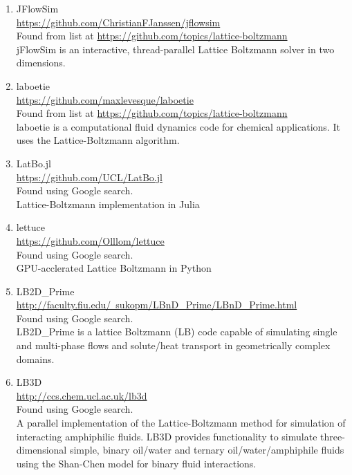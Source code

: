 \documentclass{article}
\begin{document}
\begin{enumerate}
	\item JFlowSim \\
	\href{https://github.com/ChristianFJanssen/jflowsim}{https://github.com/ChristianFJanssen/jflowsim} \\
		Found from list at \href{https://github.com/topics/lattice-boltzmann}{https://github.com/topics/lattice-boltzmann}\\
	jFlowSim is an interactive, thread-parallel Lattice Boltzmann solver in two dimensions.
	
	\item laboetie
\\
	\href{https://github.com/maxlevesque/laboetie}{https://github.com/maxlevesque/laboetie}
\\
		Found from list at \href{https://github.com/topics/lattice-boltzmann}{https://github.com/topics/lattice-boltzmann}\\
	laboetie is a computational fluid dynamics code for chemical applications.
	It uses the Lattice-Boltzmann algorithm.
	
	\item LatBo.jl \\
	\href{https://github.com/UCL/LatBo.jl}{https://github.com/UCL/LatBo.jl}
\\
	Found using Google search.\\
	Lattice-Boltzmann implementation in Julia
	
	\item lettuce
\\
	\href{https://github.com/Olllom/lettuce}{https://github.com/Olllom/lettuce}
\\
	Found using Google search.\\
	GPU-acclerated Lattice Boltzmann in Python
	
	\item LB2D\_Prime
\\
	\href{http://faculty.fiu.edu/~sukopm/LBnD_Prime/LBnD_Prime.html}{http://faculty.fiu.edu/~sukopm/LBnD\_Prime/LBnD\_Prime.html} \\
	Found using Google search.\\
	LB2D\_Prime is a lattice Boltzmann (LB) code capable of simulating single and multi-phase flows and solute/heat transport in geometrically complex domains.
	
	\item LB3D \\ 
	\href{http://ccs.chem.ucl.ac.uk/lb3d}{http://ccs.chem.ucl.ac.uk/lb3d}
\\
	Found using Google search.\\
	A parallel implementation of the Lattice-Boltzmann method for simulation of interacting amphiphilic fluids. LB3D provides functionality to simulate three-dimensional simple, binary oil/water and ternary oil/water/amphiphile fluids using the Shan-Chen model for binary fluid interactions.
	

\end{enumerate}
\end{document}
